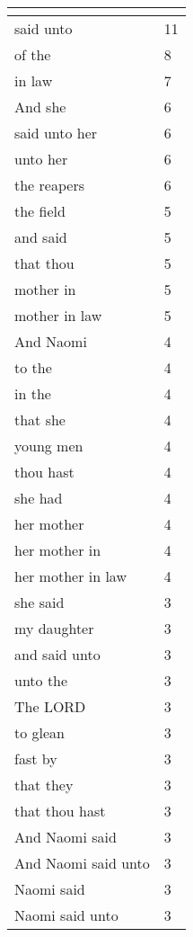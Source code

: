 \begin{center}
\begin{longtable}{|p{3.0in}|p{0.5in}|}
\hline \multicolumn{2}{c}{{ }} \\ \hline
\endfoot 
said unto & 11\\ \hline 
of the & 8\\ \hline 
in law & 7\\ \hline 
And she & 6\\ \hline 
said unto her & 6\\ \hline 
unto her & 6\\ \hline 
the reapers & 6\\ \hline 
the field & 5\\ \hline 
and said & 5\\ \hline 
that thou & 5\\ \hline 
mother in & 5\\ \hline 
mother in law & 5\\ \hline 
And Naomi & 4\\ \hline 
to the & 4\\ \hline 
in the & 4\\ \hline 
that she & 4\\ \hline 
young men & 4\\ \hline 
thou hast & 4\\ \hline 
she had & 4\\ \hline 
her mother & 4\\ \hline 
her mother in & 4\\ \hline 
her mother in law & 4\\ \hline 
she said & 3\\ \hline 
my daughter & 3\\ \hline 
and said unto & 3\\ \hline 
unto the & 3\\ \hline 
The LORD & 3\\ \hline 
to glean & 3\\ \hline 
fast by & 3\\ \hline 
that they & 3\\ \hline 
that thou hast & 3\\ \hline 
And Naomi said & 3\\ \hline 
And Naomi said unto & 3\\ \hline 
Naomi said & 3\\ \hline 
Naomi said unto & 3\\ \hline 
\end{longtable}
\end{center}





